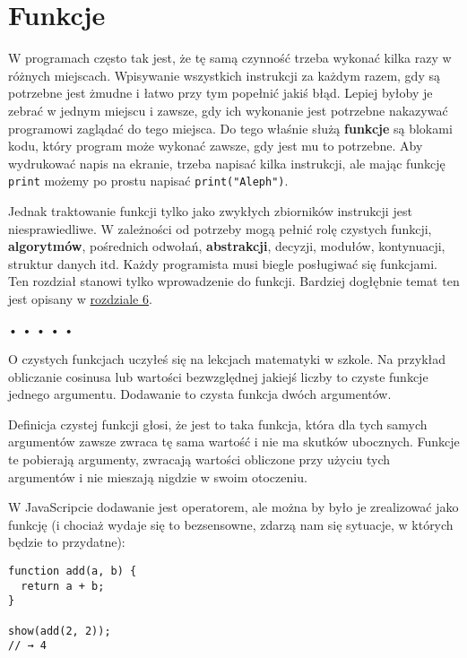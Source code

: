 \chapter{Funkcje}
\label{chap:3}
  
    
W programach często tak jest, że tę samą czynność trzeba wykonać kilka razy w różnych miejscach. Wpisywanie wszystkich instrukcji za każdym razem, gdy są potrzebne jest żmudne i łatwo przy tym popełnić jakiś błąd. Lepiej byłoby je zebrać w jednym miejscu i zawsze, gdy ich wykonanie jest potrzebne nakazywać programowi zaglądać do tego miejsca. Do tego właśnie służą \textbf{funkcje} są blokami kodu, który program może wykonać zawsze, gdy jest mu to potrzebne. Aby wydrukować napis na ekranie, trzeba napisać kilka instrukcji, ale mając funkcję \texttt{print} możemy po prostu napisać \texttt{print("Aleph")}.

    
Jednak traktowanie funkcji tylko jako zwykłych zbiorników instrukcji jest niesprawiedliwe. W zależności od potrzeby mogą pełnić rolę czystych funkcji, \textbf{algorytmów}, pośrednich odwołań, \textbf{abstrakcji}, decyzji, modułów, kontynuacji, struktur danych itd. Każdy programista musi biegle posługiwać się funkcjami. Ten rozdział stanowi tylko wprowadzenie do funkcji. Bardziej dogłębnie temat ten jest opisany w \hyperref[chap:6]{rozdziale 6}.

  
  
\begin{center}
• • • • •
\end{center}
  
    
O czystych funkcjach uczyłeś się na lekcjach matematyki w szkole. Na przykład obliczanie cosinusa lub wartości bezwzględnej jakiejś liczby to czyste funkcje jednego argumentu. Dodawanie to czysta funkcja dwóch argumentów.

    
Definicja czystej funkcji głosi, że jest to taka funkcja, która dla tych samych argumentów zawsze zwraca tę sama wartość i nie ma skutków ubocznych. Funkcje te pobierają argumenty, zwracają wartości obliczone przy użyciu tych argumentów i nie mieszają nigdzie w swoim otoczeniu.

    
W JavaScripcie dodawanie jest operatorem, ale można by było je zrealizować jako funkcję (i chociaż wydaje się to bezsensowne, zdarzą nam się sytuacje, w których będzie to przydatne):

    
\begin{verbatim} 
function add(a, b) {
  return a + b;
}

show(add(2, 2));
// → 4
\end{verbatim}
    
